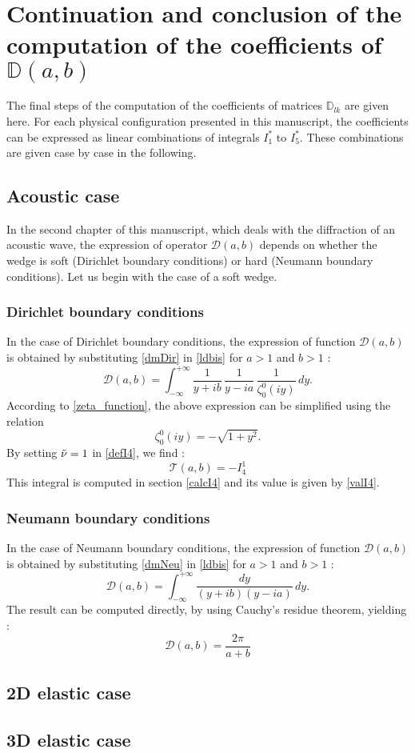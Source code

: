 \section{Continuation and conclusion of the computation of the coefficients of $\mathbb{D}(a,b)$}
\label{fincalculs}
The final steps of the computation of the coefficients of matrices $\mathbb{D}_{lk}$ are given here. For each physical configuration presented in this manuscript, the coefficients can be expressed as linear combinations of integrals $I_1^*$ to $I_5^*$. These combinations are given case by case in the following.

\subsection{Acoustic case}
\label{finalDac}
In the second chapter of this manuscript, which deals with the diffraction of an acoustic wave, the expression of operator $\mathcal{D}(a,b)$ depends on whether the wedge is soft (Dirichlet boundary conditions) or hard (Neumann boundary conditions). Let us begin with the case of a soft wedge.  
\subsubsection{Dirichlet boundary conditions}
\label{finalDacDir}
In the case of Dirichlet boundary conditions, the expression of function $\mathcal{D}(a,b)$ is obtained by substituting \eqref{dmDir} in \eqref{ldbis} for $a>1$ and $b>1$ :
\begin{equation}
\mathcal{D}(a,b) = \int_{-\infty}^{+\infty} \dfrac{1}{ y+ib} \, \dfrac{1}{y -i a} \,\dfrac{1}{\zeta_0^0(iy)} \, dy . 
\end{equation}
According to \eqref{zeta_function}, the above expression can be simplified using the relation
\begin{equation}
\zeta_0^0(iy)= - \sqrt{1+y^2}.
\label{zeta0iy}
\end{equation}
By setting $\tilde{\nu}=1$ in \eqref{defI4}, we find :
\begin{equation}
\mathcal{T}(a,b)=-I_4^1
\end{equation}
This integral is computed in section \ref{calcI4} and its value is given by \eqref{valI4}.
\subsubsection{Neumann boundary conditions}
\label{finalDacNeu}
In the case of Neumann boundary conditions, the expression of function $\mathcal{D}(a,b)$ is obtained by substituting \eqref{dmNeu} in \eqref{ldbis} for $a>1$ and $b>1$ :
\begin{equation}
\mathcal{D}(a,b) = \int_{-\infty}^{+\infty} \dfrac{dy}{ (y+ib)(y-ia)} \, dy .
\end{equation}
The result can be computed directly, by using Cauchy's residue theorem, yielding :
\begin{equation}
\mathcal{D}(a,b)=\dfrac{2\pi}{a+b}
\end{equation}

\subsection{2D elastic case}
\label{finalD2D}
\subsection{3D elastic case}
\label{finalD3D}